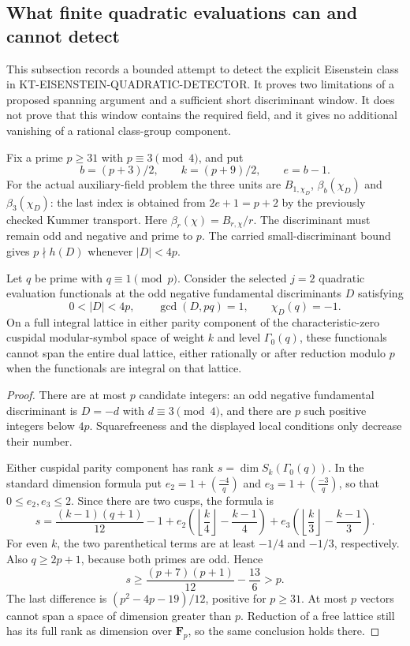 \subsection{What finite quadratic evaluations can and cannot detect}

This subsection records a bounded attempt to detect the explicit
Eisenstein class in KT-EISENSTEIN-QUADRATIC-DETECTOR.  It proves two
limitations of a proposed spanning argument and a sufficient short
discriminant window.  It does not prove that this window contains the
required field, and it gives no additional vanishing of a rational
class-group component.

Fix a prime $p\geq31$ with $p\equiv3\pmod4$, and put
\[
 b=(p+3)/2,\qquad k=(p+9)/2,\qquad e=b-1.
\]
For the actual auxiliary-field problem the three units are
$B_{1,\chi_D}$, $\beta_b(\chi_D)$ and $\beta_3(\chi_D)$:
the last index is obtained from $2e+1=p+2$ by the previously
checked Kummer transport.  Here $\beta_r(\chi)=B_{r,\chi}/r$.
The discriminant must remain odd and negative and prime to $p$.
The carried small-discriminant bound gives $p\nmid h(D)$ whenever
$|D|<4p$.

\begin{proposition}
Let $q$ be prime with $q\equiv1\pmod p$.  Consider the selected
$j=2$ quadratic evaluation functionals at the odd negative fundamental
discriminants $D$ satisfying
\[
 0<|D|<4p,\qquad \gcd(D,pq)=1,\qquad \chi_D(q)=-1.
\]
On a full integral lattice in either parity component of the
characteristic-zero cuspidal modular-symbol space of weight $k$ and
level $\Gamma_0(q)$, these functionals cannot span the entire dual
lattice, either rationally or after reduction modulo $p$ when the
functionals are integral on that lattice.
\end{proposition}

\begin{proof}
There are at most $p$ candidate integers: an odd negative fundamental
discriminant is $D=-d$ with $d\equiv3\pmod4$, and there are $p$ such
positive integers below $4p$.  Squarefreeness and the displayed local
conditions only decrease their number.

Either cuspidal parity component has rank
$s=\dim S_k(\Gamma_0(q))$.  In the standard dimension formula put
$e_2=1+(\frac{-4}{q})$ and $e_3=1+(\frac{-3}{q})$, so that
$0\leq e_2,e_3\leq2$.  Since there are two cusps, the formula is
\[
 s=\frac{(k-1)(q+1)}{12}-1
   +e_2\left(\left\lfloor\frac{k}{4}\right\rfloor
                         -\frac{k-1}{4}\right)
   +e_3\left(\left\lfloor\frac{k}{3}\right\rfloor
                         -\frac{k-1}{3}\right).
\]
For even $k$, the two parenthetical terms are at least $-1/4$
and $-1/3$, respectively.  Also $q\geq2p+1$, because both primes
are odd.  Hence
\[
 s\geq\frac{(p+7)(p+1)}{12}-\frac{13}{6}>p.
\]
The last difference is $(p^2-4p-19)/12$, positive for $p\geq31$.
At most $p$ vectors cannot span a space of dimension greater than
$p$.  Reduction of a free lattice still has its full rank as
dimension over $\mathbf F_p$, so the same conclusion holds there.
\end{proof}

